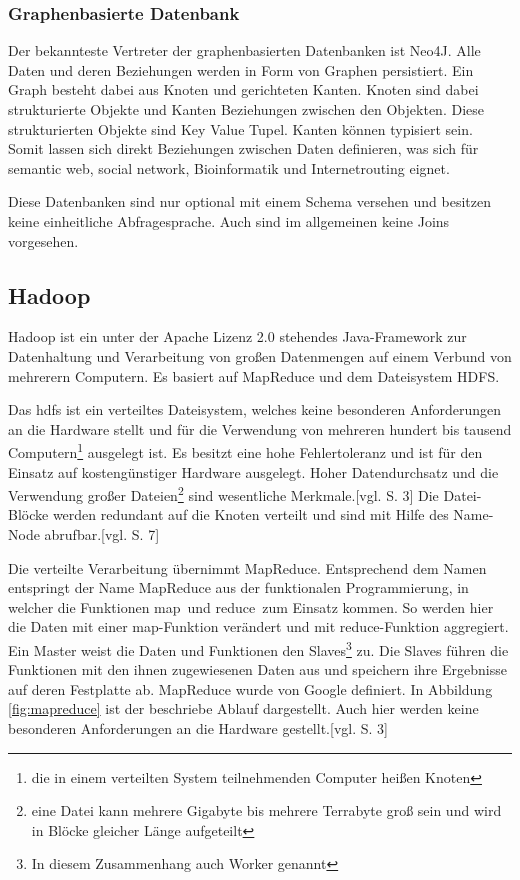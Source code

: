 \subsubsection{Graphenbasierte Datenbank}

Der bekannteste Vertreter der graphenbasierten Datenbanken ist Neo4J.
Alle Daten und deren Beziehungen werden in Form von Graphen persistiert.
Ein Graph besteht dabei aus Knoten und gerichteten Kanten.
Knoten sind dabei strukturierte Objekte und Kanten Beziehungen zwischen den Objekten.
Diese strukturierten Objekte sind Key Value Tupel.
Kanten können typisiert sein.
Somit lassen sich direkt Beziehungen zwischen Daten definieren, was sich für semantic web, social network, Bioinformatik und Internetrouting eignet.

Diese Datenbanken sind nur optional mit einem Schema versehen und besitzen keine einheitliche Abfragesprache.
Auch sind im allgemeinen keine Joins vorgesehen.


\subsection{Hadoop}

Hadoop ist ein unter der Apache Lizenz 2.0 stehendes Java-Framework zur Datenhaltung und Verarbeitung von großen Datenmengen auf einem Verbund von mehrerern Computern.
Es basiert auf MapReduce und dem Dateisystem HDFS.

Das \Gls{hdfs} ist ein verteiltes Dateisystem, welches keine besonderen Anforderungen an die Hardware stellt und für die Verwendung von mehreren hundert bis tausend Computern\footnote{die in einem verteilten System teilnehmenden Computer heißen Knoten} ausgelegt ist.
Es besitzt eine hohe Fehlertoleranz und ist für den Einsatz auf kostengünstiger Hardware ausgelegt.
Hoher Datendurchsatz und die Verwendung großer Dateien\footnote{eine Datei kann mehrere Gigabyte bis mehrere Terrabyte groß sein und wird in Blöcke gleicher Länge aufgeteilt} sind wesentliche Merkmale.[vgl. \cite{paper:hadoop} S. 3]
Die Datei-Blöcke werden redundant auf die Knoten verteilt und sind mit Hilfe des Name-Node abrufbar.[vgl. \cite{ba:dan} S. 7]

Die verteilte Verarbeitung übernimmt MapReduce.
Entsprechend dem Namen entspringt der Name MapReduce aus der funktionalen Programmierung, in welcher die Funktionen \glqq map\grqq \ und \glqq reduce\grqq \ zum Einsatz kommen.
So werden hier die Daten mit einer map-Funktion verändert und mit reduce-Funktion aggregiert.
Ein Master weist die Daten und Funktionen den Slaves\footnote{In diesem Zusammenhang auch Worker genannt} zu.
Die Slaves führen die Funktionen mit den ihnen zugewiesenen Daten aus und speichern ihre Ergebnisse auf deren Festplatte ab.
MapReduce wurde von Google definiert.
In Abbildung \ref{fig:mapreduce} ist der beschriebe Ablauf dargestellt.
Auch hier werden keine besonderen Anforderungen an die Hardware gestellt.[vgl. \cite{paper:mapreduce} S. 3]

